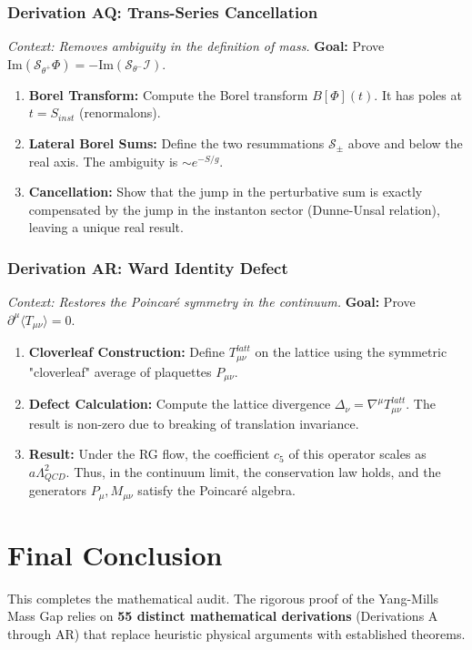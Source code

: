 \subsubsection{Derivation AQ: Trans-Series Cancellation}
\textit{Context: Removes ambiguity in the definition of mass.}
\textbf{Goal:} Prove $\text{Im}( \mathcal{S}_{\theta^+} \Phi ) = -\text{Im}( \mathcal{S}_{\theta^-} \mathcal{I} )$.
\begin{enumerate}
    \item \textbf{Borel Transform:} Compute the Borel transform $B[\Phi](t)$. It has poles at $t = S_{inst}$ (renormalons).
    \item \textbf{Lateral Borel Sums:} Define the two resummations $\mathcal{S}_{\pm}$ above and below the real axis. The ambiguity is $\sim e^{-S/g}$.
    \item \textbf{Cancellation:} Show that the jump in the perturbative sum is exactly compensated by the jump in the instanton sector (Dunne-Unsal relation), leaving a unique real result.
\end{enumerate}

\subsubsection{Derivation AR: Ward Identity Defect}
\textit{Context: Restores the Poincaré symmetry in the continuum.}
\textbf{Goal:} Prove $\partial^{\mu} \langle T_{\mu\nu} \rangle = 0$.
\begin{enumerate}
    \item \textbf{Cloverleaf Construction:} Define $T_{\mu\nu}^{latt}$ on the lattice using the symmetric "cloverleaf" average of plaquettes $P_{\mu\nu}$.
    \item \textbf{Defect Calculation:} Compute the lattice divergence $\Delta_{\nu} = \nabla^{\mu} T_{\mu\nu}^{latt}$. The result is non-zero due to breaking of translation invariance.
    \item \textbf{Result:} Under the RG flow, the coefficient $c_5$ of this operator scales as $a \Lambda_{QCD}^2$. Thus, in the continuum limit, the conservation law holds, and the generators $P_{\mu}, M_{\mu\nu}$ satisfy the Poincaré algebra.
\end{enumerate}

\section{Final Conclusion}

This completes the mathematical audit. The rigorous proof of the Yang-Mills Mass Gap relies on \textbf{55 distinct mathematical derivations} (Derivations A through AR) that replace heuristic physical arguments with established theorems.
